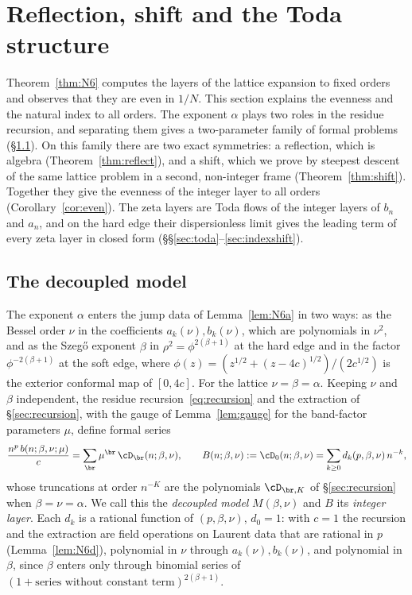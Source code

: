 \section{Reflection, shift and the Toda structure}\label{sec:shiftsec}

Theorem~\ref{thm:N6} computes the layers of the lattice expansion to fixed orders and observes that they are even in $1/N$.
This section explains the evenness and the natural index to all orders. The exponent $\alpha$ plays two roles in the
residue recursion, and separating them gives a two-parameter family of formal problems (\S\ref{sec:decoupled}). On this
family there are two exact symmetries: a reflection, which is algebra (Theorem~\ref{thm:reflect}), and a shift, which we
prove by steepest descent of the same lattice problem in a second, non-integer frame (Theorem~\ref{thm:shift}). Together they
give the evenness of the integer layer to all orders (Corollary~\ref{cor:even}). The zeta layers are Toda flows of the integer
layers of $b_n$ and $a_n$, and on the hard edge their dispersionless limit gives the leading term of every zeta layer in closed form
(\S\S\ref{sec:toda}--\ref{sec:indexshift}).

\subsection{The decoupled model}\label{sec:decoupled}
The exponent $\alpha$ enters the jump data of Lemma~\ref{lem:N6a} in two ways: as the Bessel order $\nu$ in the coefficients
$a_k(\nu),b_k(\nu)$, which are polynomials in $\nu^2$, and as the Szeg\H{o} exponent $\beta$ in $\rho^2=\phi^{2(\beta+1)}$ at the hard
edge and in the factor $\phi^{-2(\beta+1)}$ at the soft edge, where $\phi(z)=(z^{1/2}+(z-4c)^{1/2})/(2c^{1/2})$ is the exterior
conformal map of $[0,4c]$. For the lattice $\nu=\beta=\alpha$. Keeping $\nu$ and $\beta$ independent, the residue
recursion~\eqref{eq:recursion} and the extraction of \S\ref{sec:recursion}, with the gauge of Lemma~\ref{lem:gauge} for the
band-factor parameters $\mu$, define formal series
\begin{equation}\label{eq:decoupled}
  \frac{n^p\,b(n;\beta,\nu;\mu)}{c}=\sum_{\br}\mu^{\br}\,\cD_{\br}(n;\beta,\nu),\qquad
  B(n;\beta,\nu):=\cD_0(n;\beta,\nu)=\sum_{k\ge0}d_k(p,\beta,\nu)\,n^{-k},
\end{equation}
whose truncations at order $n^{-K}$ are the polynomials $\cD_{\br,K}$ of \S\ref{sec:recursion} when $\beta=\nu=\alpha$. We call
this the \emph{decoupled model} $M(\beta,\nu)$ and $B$ its \emph{integer layer}. Each $d_k$ is a rational function of
$(p,\beta,\nu)$, $d_0=1$: with $c=1$ the recursion and the extraction are field operations on Laurent data that are rational
in $p$ (Lemma~\ref{lem:N6d}), polynomial in $\nu$ through $a_k(\nu),b_k(\nu)$, and polynomial in $\beta$, since $\beta$ enters
only through binomial series of $(1+\text{series without constant term})^{2(\beta+1)}$.

